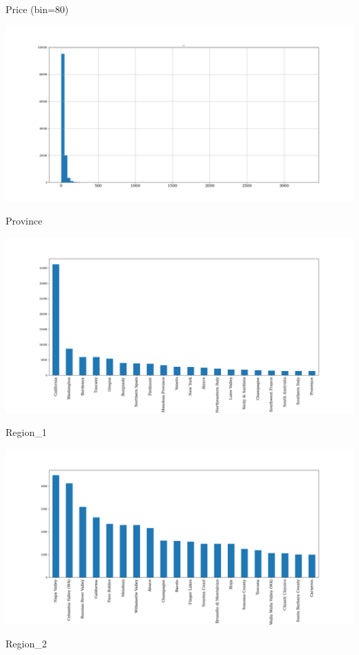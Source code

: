 \documentclass[11pt]{article}
\begin{document}
Price (bin=80)

\includegraphics[width=\textwidth,height=\textheight,keepaspectratio]{figures/1c_histogram_of_price.png}

Province

\includegraphics[width=\textwidth,height=\textheight,keepaspectratio]{figures/1c_histogram_of_province.png}

Region\_1

\includegraphics[width=\textwidth,height=\textheight,keepaspectratio]{figures/1c_histogram_of_region_1.png}

Region\_2
\end{document}
